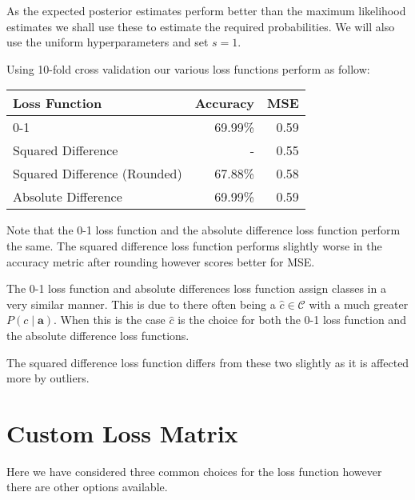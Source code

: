 As the expected posterior estimates perform better than the maximum likelihood estimates we shall use these to estimate the required probabilities.
We will also use the uniform hyperparameters and set $s=1$.

Using 10-fold cross validation our various loss functions perform as follow:

\begin{center}
	\begin{tabular}{l r r}
		\hline
		Loss Function                & Accuracy & MSE  \\
		\hline
		0-1                          & 69.99\%  & 0.59 \\
		Squared Difference           & -        & 0.55 \\
		Squared Difference (Rounded) & 67.88\%  & 0.58 \\
		Absolute Difference          & 69.99\%  & 0.59 \\
		\hline
	\end{tabular}
\end{center}

Note that the 0-1 loss function and the absolute difference loss function perform the same.
The squared difference loss function performs slightly worse in the accuracy metric after rounding however scores better for MSE.

The 0-1 loss function and absolute differences loss function assign classes in a very similar manner.
This is due to there often being a $\hat{c} \in \mathcal{C}$ with a much greater $P(c \mid \mathbf{a})$.
When this is the case $\hat{c}$ is the choice for both the 0-1 loss function and the absolute difference loss functions.

The squared difference loss function differs from these two slightly as it is affected more by outliers.

\section{Custom Loss Matrix}
Here we have considered three common choices for the loss function however there are other options available.

